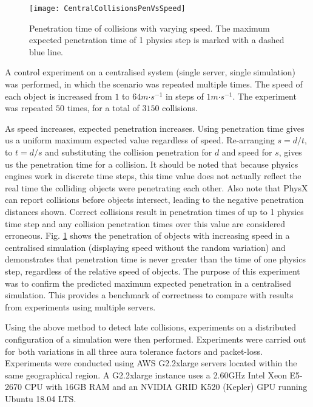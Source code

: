 \begin{figure}[t]
	\centering
	\texttt{[image: CentralCollisionsPenVsSpeed]}
	\caption{Penetration time of collisions with varying speed. The maximum expected penetration time of 1 physics step is marked with a dashed blue line.}
	\label{fig_ErrorControlTime}
\end{figure}

A control experiment on a centralised system (single server, single simulation) was performed, in which the scenario was repeated multiple times. The speed of each object is increased from $1$ to $64m\mathord{\cdot}s^{-1}$ in steps of $1m\mathord{\cdot}s^{-1}$. The experiment was repeated $50$ times, for a total of $3150$ collisions. %

As speed increases, expected penetration increases. Using penetration time gives us a uniform maximum expected value regardless of speed.
Re-arranging $s=d/t$, to $t=d/s$ and substituting the collision penetration for $d$ and speed for $s$, gives us the penetration time for a collision. It should be noted that because physics engines work in discrete time steps, this time value does not actually reflect the real time the colliding objects were penetrating each other. Also note that PhysX can report collisions before objects intersect, leading to the negative penetration distances shown. Correct collisions result in penetration times of up to 1 physics time step and any collision penetration times over this value are considered erroneous. Fig. \ref{fig_ErrorControlTime} shows the penetration of objects with increasing speed in a centralised simulation (displaying speed without the random variation) and demonstrates that penetration time is never greater than the time of one physics step, regardless of the relative speed of objects. The purpose of this experiment was to confirm the predicted maximum expected penetration in a centralised simulation. This provides a benchmark of correctness to compare with results from experiments using multiple servers.

Using the above method to detect late collisions, experiments on a distributed configuration of a simulation were then performed. Experiments were carried out for both variations in all three aura tolerance factors and packet-loss. Experiments were conducted using AWS G2.2xlarge servers located within the same geographical region. A G2.2xlarge instance uses a 2.60GHz Intel Xeon E5-2670 CPU with 16GB RAM and an NVIDIA GRID K520 (Kepler) GPU running Ubuntu 18.04 LTS.

